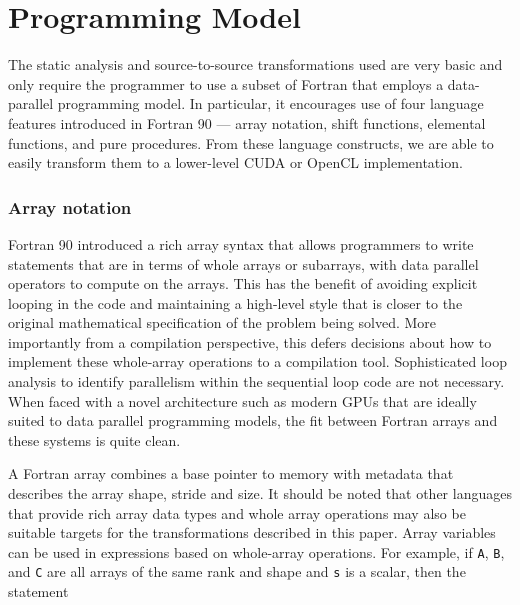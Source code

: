 \section{Programming Model}

The static analysis and source-to-source transformations used are very
basic and only require the programmer to use a subset of Fortran that
employs a data-parallel programming model.  In particular, it
encourages use of four language features introduced in Fortran 90 ---
array notation, shift functions, elemental functions, and pure
procedures.  From these language constructs, we are able to easily
transform them to a lower-level CUDA or OpenCL implementation.


\subsubsection*{Array notation}

Fortran 90 introduced a rich array syntax that allows programmers to
write statements that are in terms of whole arrays or subarrays, with
data parallel operators to compute on the arrays.  This has the
benefit of avoiding explicit looping in the code and maintaining a
high-level style that is closer to the original mathematical
specification of the problem being solved.  More importantly from a
compilation perspective, this defers decisions about how to implement
these whole-array operations to a compilation tool.  Sophisticated
loop analysis to identify parallelism within the sequential loop code
are not necessary.  When faced with a novel architecture such as
modern GPUs that are ideally suited to data parallel programming
models, the fit between Fortran arrays and these systems is quite
clean.

A Fortran array combines a base pointer to memory with metadata that
describes the array shape, stride and size. It should be noted that
other languages that provide rich array data types and whole array
operations may also be suitable targets for the transformations
described in this paper.  Array variables can be used in expressions
based on whole-array operations.  For example, if {\tt A}, {\tt B},
and {\tt C} are all arrays of the same rank and shape and {\tt s} is a
scalar, then the statement

